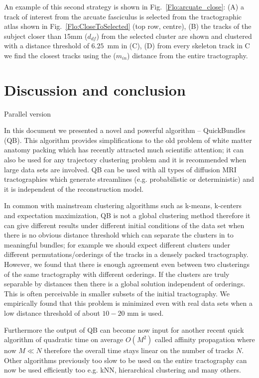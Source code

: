 \documentclass[preprint,authoryear,a4paper,10pt,onecolumn]{elsarticle}
\begin{document}
An example of this second strategy is shown in
Fig.~\ref{Flo:arcuate_close}: (A) a track of interest from the arcuate
fasciculus is selected from the tractographic atlas shown in
Fig.~\ref{Flo:CloseToSelected} (top row, centre), (B) the tracks of the
subject closer than 15mm ($d_{df}$) from the selected cluster are shown
and clustered with a distance threshold of $6.25$~mm in (C), (D) from
every skeleton track in C we find the closest tracks using the
($m_{in}$) distance from the entire tractography.


\section{Discussion and conclusion}

Parallel version

In this document we presented a novel and powerful algorithm --
QuickBundles (QB). This algorithm provides simplifications to the old
problem of white matter anatomy packing which has recently attracted
much scientific attention; it can also be used for any trajectory
clustering problem and it is recommended when large data sets are
involved. QB can be used with all types of diffusion MRI tractographies
which generate streamlines (e.g. probabilistic or deterministic) and it
is independent of the reconstruction model.

In common with mainstream clustering algorithms such as k-means,
k-centers and expectation maximization, QB is not a global clustering
method therefore it can give different results under different initial
conditions of the data set when there is no obvious distance threshold
which can separate the clusters in to meaningful bundles; for example we
should expect different clusters under different permutations/orderings
of the tracks in a densely packed tractography. However, we found that
there is enough agreement even between two clusterings of the same
tractography with different orderings. If the clusters are truly
separable by distances then there is a global solution independent of
orderings. This is often perceivable in smaller subsets of the initial
tractography. We empirically found that this problem is minimized even
with real data sets when a low distance threshold of about $10-20$ mm is
used.

Furthermore the output of QB can become now input for another recent
quick algorithm of quadratic time on average $O(M^{2})$ called affinity
propagation where now $M\ll N$ therefore the overall time stays linear
on the number of tracks $N$. Other algorithms previously too slow to be
used on the entire tractography can now be used efficiently too
e.g. kNN, hierarchical clustering and many others.
\end{document}
